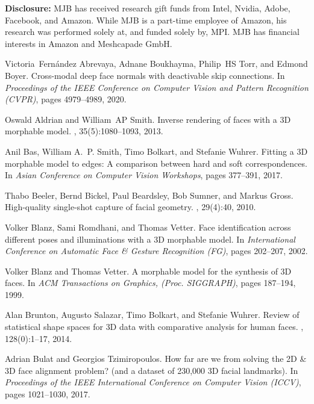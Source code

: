 \documentclass[final]{cvpr}
\newcommand{\qheading}[1]{\noindent\textbf{#1}}
\begin{document}
\qheading{Disclosure:}
MJB has received research gift funds from Intel, Nvidia, Adobe, Facebook, and Amazon. While MJB is a
part-time employee of Amazon, his research was performed solely at, and funded solely by, MPI. 
MJB has financial interests in Amazon and Meshcapade GmbH.
 
{\small
\begin{thebibliography}{10}\itemsep=-1pt

Victoria~Fern{\'a}ndez Abrevaya, Adnane Boukhayma, Philip~HS Torr, and Edmond
  Boyer.
\newblock Cross-modal deep face normals with deactivable skip connections.
\newblock In {\em Proceedings of the IEEE Conference on Computer Vision and
  Pattern Recognition (CVPR)}, pages 4979--4989, 2020.

Oswald Aldrian and William~AP Smith.
\newblock Inverse rendering of faces with a {3D} morphable model.
, 35(5):1080--1093, 2013.

Anil Bas, William A.~P. Smith, Timo Bolkart, and Stefanie Wuhrer.
\newblock Fitting a {3D} morphable model to edges: A comparison between hard
  and soft correspondences.
\newblock In {\em Asian Conference on Computer Vision Workshops}, pages
  377--391, 2017.

Thabo Beeler, Bernd Bickel, Paul Beardsley, Bob Sumner, and Markus Gross.
\newblock High-quality single-shot capture of facial geometry.
, 29(4):40, 2010.

Volker Blanz, Sami Romdhani, and Thomas Vetter.
\newblock Face identification across different poses and illuminations with a
  {3D} morphable model.
\newblock In {\em International Conference on Automatic Face \& Gesture
  Recognition (FG)}, pages 202--207, 2002.

Volker Blanz and Thomas Vetter.
\newblock A morphable model for the synthesis of {3D} faces.
\newblock In {\em ACM Transactions on Graphics, (Proc. SIGGRAPH)}, pages
  187--194, 1999.

Alan Brunton, Augusto Salazar, Timo Bolkart, and Stefanie Wuhrer.
\newblock Review of statistical shape spaces for {3D} data with comparative
  analysis for human faces.
, 128(0):1--17,
  2014.

Adrian Bulat and Georgios Tzimiropoulos.
\newblock How far are we from solving the {2D} \& {3D} face alignment problem?
  (and a dataset of 230,000 {3D} facial landmarks).
\newblock In {\em Proceedings of the IEEE International Conference on Computer
  Vision (ICCV)}, pages 1021--1030, 2017.


\end{thebibliography}}
\end{document}
